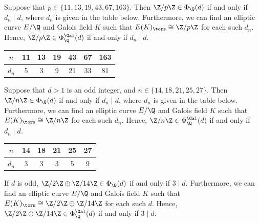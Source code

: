 \begin{frame}[plain,c]
\scriptsize
\begin{lem}[M.]
Suppose that $p \in \{ 11, 13, 19, 43, 67, 163 \}$. Then $\Z/p\Z \in \Phi_\Q(d)$ if and only if $d_n \mid d$, where $d_n$ is given in the table below. Furthermore, we can find an elliptic curve $E/\Q$ and Galois field $K$ such that $E(K)_\tors \cong \Z/p\Z$ for each such $d_n$. Hence, $\Z/p\Z \in \Phi_\Q^{\Gal}(d)$ if and only if $d_n \mid d$.
	\begin{table}[!ht]
	\centering
	\begin{tabular}{|c||cccccc|} \hline
	$n$ & 11 & 13 & 19 & 43 & 67 & 163 \\ \hline
	$d_n$ & 5 & 3 & 9 & 21 & 33 & 81 \\ \hline
	\end{tabular}
	\end{table}
\end{lem}

\begin{lem}[M.] \label{lem:oddgalfinp}
Suppose that $d > 1$ is an odd integer, and $n \in \{ 14, 18, 21, 25, 27 \}$. Then $\Z/n\Z \in \Phi_\Q(d)$ if and only if $d_n \mid d$, where $d_n$ is given in the table below. Furthermore, we can find an elliptic curve $E/\Q$ and Galois field $K$ such that $E(K)_\tors \cong \Z/n\Z$ for each such $d_n$. Hence, $\Z/n\Z \in \Phi_\Q^{\Gal}(d)$ if and only if $d_n \mid d$.
	\begin{table}[!ht]
	\centering
	\begin{tabular}{|c||ccccc|} \hline
	$n$ & 14 & 18 & 21 & 25 & 27 \\ \hline
	$d_n$ & 3 & 3 & 3 & 5 & 9 \\ \hline
	\end{tabular}
	\end{table}
\end{lem}

\begin{lem}[M.]
If $d$ is odd, $\Z/2\Z \oplus \Z/14\Z \in \Phi_\Q(d)$ if and only if $3 \mid d$. Furthermore, we can find an elliptic curve $E/\Q$ and Galois field $K$ such that $E(K)_\tors \cong \Z/2\Z \oplus \Z/14\Z$ for each such $d$. Hence, $\Z/2\Z \oplus \Z/14\Z \in \Phi_\Q^{\Gal}(d)$ if and only if $3 \mid d$.
\end{lem} 
\end{frame}






